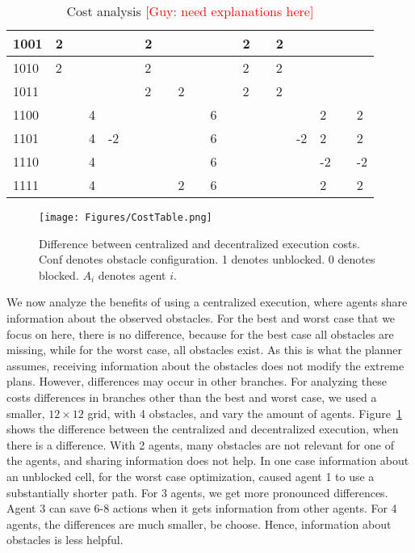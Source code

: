 \documentclass[letterpaper]{article} %
\newcommand{\guy}[1]{{\textcolor{red}{[Guy: #1]}}}
\begin{document}
{\begin{table}
\begin{tabular}{|l||l|l||l|l||l|l|l||l|l|l||l|l|l|l||l|l|l|l|}
1001	&	2	&		&		&		&			&	2	&		&		&		&		&			&	2	&		&	2	&		&		&		&		\\ \hline
1010	&	2	&		&		&		&			&	2	&		&		&		&		&			&	2	&		&	2	&		&		&		&		\\ \hline
1011	&		&		&		&		&			&	2	&		&	2	&		&		&			&	2	&		&	2	&		&		&		&		\\ \hline
1100	&		&		&	4	&		&			&		&		&		&		&	6	&			&		&		&		&		&	2	&		&	2	\\ \hline
1101	&		&		&	4	&	-2	&			&		&		&		&		&	6	&			&		&		&		&	-2	&	2	&		&	2	\\ \hline
1110	&		&		&	4	&		&			&		&		&		&		&	6	&			&		&		&		&		&	-2	&		&	-2	\\ \hline
1111	&		&		&	4	&		&			&		&		&	2	&		&	6	&			&		&		&		&		&	2	&		&	2	\\ \hline
\end{tabular}
\caption{Cost analysis \guy{need explanations here}}
\label{tbl:costs}
\end{table}
}
\begin{figure}[t]
\centering
\texttt{[image: Figures/CostTable.png]}
      \caption{Difference between centralized and decentralized execution costs. Conf denotes obstacle configuration. 1 denotes unblocked. 0 denotes blocked. $A_i$ denotes agent $i$.}
      \label{fig:CostTable}
\end{figure}
We now analyze the benefits of using a centralized execution, where agents share information about the observed obstacles. For the best and worst case that we focus on here, there is no difference, because for the best case all obstacles are missing, while for the worst case, all obstacles exist. As this is what the planner assumes, receiving information about the obstacles does not modify the extreme plans. However, differences may occur in other branches.
For analyzing these costs differences in branches other than the best and worst case, we used a smaller, $12\times 12$ grid, with 4 obstacles, and vary the amount of agents. Figure~\ref{fig:CostTable} shows the difference between the centralized and decentralized execution, when there is a difference. With 2 agents, many obstacles are not relevant for one of the agents, and sharing information does not help. In one case  information about an unblocked cell, for the worst case optimization, caused agent 1 to use a substantially shorter path.
For 3 agents, we get more pronounced differences. Agent 3 can save 6-8 actions when it gets information from other agents. For 4 agents, the differences are much smaller, be  choose. Hence, information about obstacles is less helpful.
\end{document}
